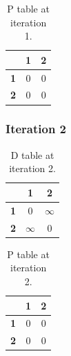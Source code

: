 \documentclass{article}
\begin{document}
\begin{table}[!ht]
\begin{adjustwidth}{-3cm}{-3cm}
\centering
\begin{tabular}{c||c|c|}
\cline{2-3}
 & \cellcolor{gray90}\textbf{1} & \cellcolor{gray90}\textbf{2} \\
\hline\hline
\multicolumn{1}{|c||}{\cellcolor{gray90}\textbf{1}} & 0 & 0 \\ \hline
\multicolumn{1}{|c||}{\cellcolor{gray90}\textbf{2}} & 0 & 0 \\ \hline
\end{tabular}
\caption{P table at iteration 1.}
\end{adjustwidth}
\end{table}

\clearpage
\subsubsection{Iteration 2}
\begin{table}[!ht]
\begin{adjustwidth}{-3cm}{-3cm}
\centering
\begin{tabular}{c||c|c|}
\cline{2-3}
 & \cellcolor{gray90}\textbf{1} & \cellcolor{gray90}\textbf{2} \\
\hline\hline
\multicolumn{1}{|c||}{\cellcolor{gray90}\textbf{1}} & 0 & $\infty$ \\ \hline
\multicolumn{1}{|c||}{\cellcolor{gray90}\textbf{2}} & $\infty$ & 0 \\ \hline
\end{tabular}
\caption{D table at iteration 2.}
\end{adjustwidth}
\end{table}

\begin{table}[!ht]
\begin{adjustwidth}{-3cm}{-3cm}
\centering
\begin{tabular}{c||c|c|}
\cline{2-3}
 & \cellcolor{gray90}\textbf{1} & \cellcolor{gray90}\textbf{2} \\
\hline\hline
\multicolumn{1}{|c||}{\cellcolor{gray90}\textbf{1}} & 0 & 0 \\ \hline
\multicolumn{1}{|c||}{\cellcolor{gray90}\textbf{2}} & 0 & 0 \\ \hline
\end{tabular}
\caption{P table at iteration 2.}
\end{adjustwidth}
\end{table}
\end{document}
